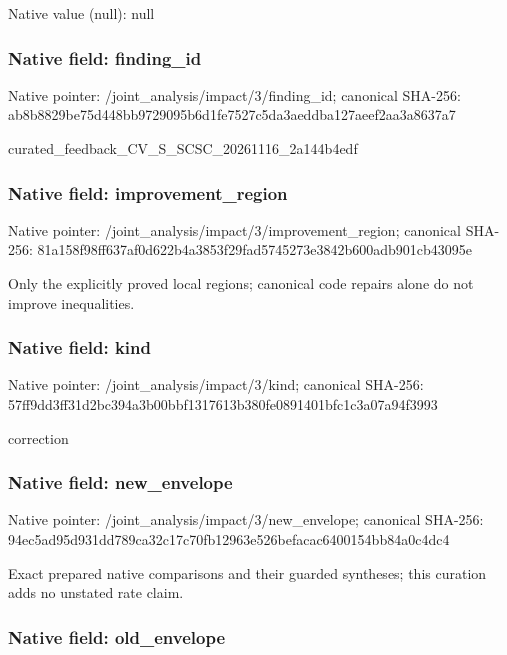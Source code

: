 \documentclass[10pt,a4paper]{article}
\begin{document}
Native value (null): null



\subsubsection{Native field: finding\_id}


Native pointer: /joint\_analysis/impact/3/finding\_id; canonical SHA-256: ab8b8829be75d448bb972909\allowbreak{}5b6d1fe7527c5da3aeddba12\allowbreak{}7aeef2aa3a8637a7


curated\_feedback\_CV\_S\_SC\allowbreak{}SC\_20261116\_2a144b4edf


\subsubsection{Native field: improvement\_region}


Native pointer: /joint\_analysis/impact/3\allowbreak{}/improvement\_region; canonical SHA-256: 81a158f98ff637af0d622b4a\allowbreak{}3853f29fad5745273e3842b6\allowbreak{}00adb901cb43095e


Only the explicitly proved local regions; canonical code repairs alone do not improve inequalities.


\subsubsection{Native field: kind}


Native pointer: /joint\_analysis/impact/3/kind; canonical SHA-256: 57ff9dd3ff31d2bc394a3b00\allowbreak{}bbf1317613b380fe0891401b\allowbreak{}fc1c3a07a94f3993


correction


\subsubsection{Native field: new\_envelope}


Native pointer: /joint\_analysis/impact/3/new\_envelope; canonical SHA-256: 94ec5ad95d931dd789ca32c1\allowbreak{}7c70fb12963e526befacac64\allowbreak{}00154bb84a0c4dc4


Exact prepared native comparisons and their guarded syntheses; this curation adds no unstated rate claim.


\subsubsection{Native field: old\_envelope}
\end{document}
